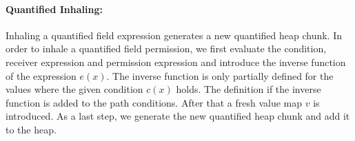 \documentclass[12pt]{article}
\begin{document}

\paragraph{Quantified Inhaling:}
Inhaling a quantified field expression generates a new quantified heap chunk. 
In order to inhale a quantified field permission, we first evaluate the condition, receiver expression and permission expression and introduce the inverse function of the expression \(e(x)\). The inverse function is only partially defined for the values where the given condition \(c(x)\) holds. The definition if the inverse function is added to the path conditions.
After that a fresh value map \(v\) is introduced. As a last step, we generate the new quantified heap chunk and add it to the heap.
\end{document}
